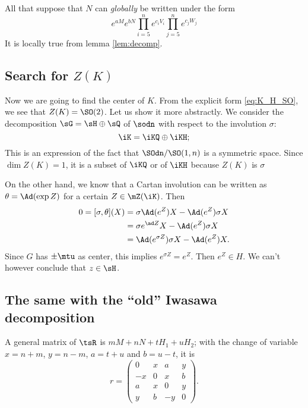 All that suppose that $N$ can \emph{globally} be written under the form
\[
  e^{aM}e^{bN}\prod_{i=5}^{n}e^{c_iV_i}\prod_{j=5}^{n}e^{c_jW_j}
\]
It is locally true from lemma \ref{lem:decomp}.


\subsection{Search for \texorpdfstring{$Z(K)$}{ZK}}

Now we are going to find the center of $K$. From the explicit form \eqref{eq:K_H_SO}, we see that $Z(K)=\SO(2)$. Let us show it more abstractly. We consider the decomposition $\sG=\sH\oplus\sQ$ of $\sodn$ with respect to the involution $\sigma$:
\[
   \iK=\iKQ\oplus\iKH;
\]
This is an expression of the fact that $\SOdn/\SO(1,n)$ is a symmetric space. Since $\dim Z(K)=1$, it is a subset of $\iKQ$ or of $\iKH$ because $Z(K)$ is $\sigma$

On the other hand, we know that a Cartan involution can be written as $\theta=\Ad(\exp Z)$ for a certain $Z\in \mZ(\iK)$. Then
\begin{equation}
\begin{split}
  0=[\sigma,\theta](X)&=\sigma\Ad(e^Z)X-\Ad(e^Z)\sigma X\\
                      &=\sigma e^{\ad Z}X-\Ad(e^Z)\sigma X\\
		      &=\Ad(e^{\sigma Z})\sigma X-\Ad(e^Z)X.
\end{split}
\end{equation}
Since $G$ has $\pm\mtu$ as center, this implies $e^{\sigma Z}=e^Z$. Then $e^Z\in H$. We can't however conclude that $z\in\sH$.

\subsection{The same with the ``old'' Iwasawa decomposition}

A general matrix of $\tsR$ is $mM+nN+tH_1+uH_2$; with the change of variable $x=n+m$, $y=n-m$, $a=t+u$ and $b=u-t$, it is
\begin{equation}
r=
\begin{pmatrix}
  0  & x & a  & y\\
  -x & 0 & x  & b\\
  a  & x & 0  & y\\
  y  & b & -y & 0
 \end{pmatrix}.
\end{equation}

